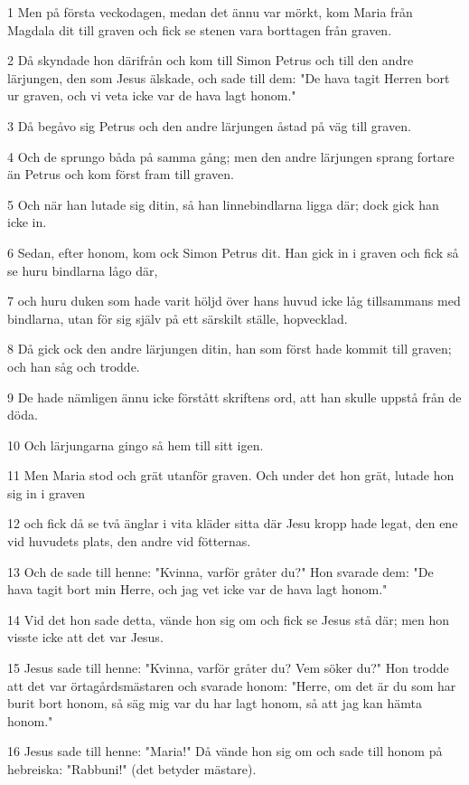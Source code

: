 \par 1 Men på första veckodagen, medan det ännu var mörkt, kom Maria från Magdala dit till graven och fick se stenen vara borttagen från graven.
\par 2 Då skyndade hon därifrån och kom till Simon Petrus och till den andre lärjungen, den som Jesus älskade, och sade till dem: "De hava tagit Herren bort ur graven, och vi veta icke var de hava lagt honom."
\par 3 Då begåvo sig Petrus och den andre lärjungen åstad på väg till graven.
\par 4 Och de sprungo båda på samma gång; men den andre lärjungen sprang fortare än Petrus och kom först fram till graven.
\par 5 Och när han lutade sig ditin, så han linnebindlarna ligga där; dock gick han icke in.
\par 6 Sedan, efter honom, kom ock Simon Petrus dit. Han gick in i graven och fick så se huru bindlarna lågo där,
\par 7 och huru duken som hade varit höljd över hans huvud icke låg tillsammans med bindlarna, utan för sig själv på ett särskilt ställe, hopvecklad.
\par 8 Då gick ock den andre lärjungen ditin, han som först hade kommit till graven; och han såg och trodde.
\par 9 De hade nämligen ännu icke förstått skriftens ord, att han skulle uppstå från de döda.
\par 10 Och lärjungarna gingo så hem till sitt igen.
\par 11 Men Maria stod och grät utanför graven. Och under det hon grät, lutade hon sig in i graven
\par 12 och fick då se två änglar i vita kläder sitta där Jesu kropp hade legat, den ene vid huvudets plats, den andre vid fötternas.
\par 13 Och de sade till henne: "Kvinna, varför gråter du?" Hon svarade dem: "De hava tagit bort min Herre, och jag vet icke var de hava lagt honom."
\par 14 Vid det hon sade detta, vände hon sig om och fick se Jesus stå där; men hon visste icke att det var Jesus.
\par 15 Jesus sade till henne: "Kvinna, varför gråter du? Vem söker du?" Hon trodde att det var örtagårdsmästaren och svarade honom: "Herre, om det är du som har burit bort honom, så säg mig var du har lagt honom, så att jag kan hämta honom."
\par 16 Jesus sade till henne: "Maria!" Då vände hon sig om och sade till honom på hebreiska: "Rabbuni!" (det betyder mästare).
